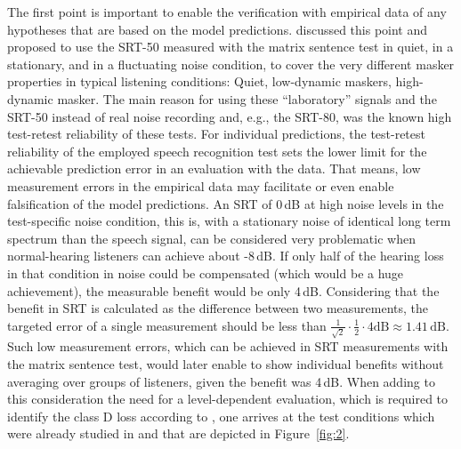 \documentclass[10pt,a4paper,twocolumn]{article}
\begin{document}
The first point is important to enable the verification with empirical data of any hypotheses that are based on the model predictions.
%
\cite{schaedler2020a} discussed this point and proposed to use the SRT-50 measured with the matrix sentence test in quiet, in a stationary, and in a fluctuating noise condition, to cover the very different masker properties in typical listening conditions: Quiet, low-dynamic maskers, high-dynamic masker.
%
The main reason for using these \enquote{laboratory} signals and the SRT-50 instead of real noise recording and, e.g., the SRT-80, was the known high test-retest reliability of these tests.
%
For individual predictions, the test-retest reliability of the employed speech recognition test sets the lower limit for the achievable prediction error in an evaluation with the data.
%
That means, low measurement errors in the empirical data may facilitate or even enable falsification of the model predictions.
%
An SRT of 0\,dB at high noise levels in the test-specific noise condition, this is, with a stationary noise of identical long term spectrum than the speech signal, can be considered very problematic when normal-hearing listeners can achieve about -8\,dB.
%
If only half of the hearing loss in that condition in noise could be compensated (which would be a huge achievement), the measurable benefit would be only 4\,dB.
%
Considering that the benefit in SRT is calculated as the difference between two measurements, the targeted error of a single measurement should be less than $\frac{1}{\sqrt{2}} \cdot \frac{1}{2} \cdot 4\text{dB} \approx 1.41\,\text{dB}$.
%
Such low measurement errors, which can be achieved in SRT measurements with the matrix sentence test, would later enable to show individual benefits without averaging over groups of listeners, given the benefit was 4\,dB.
%
When adding to this consideration the need for a level-dependent evaluation, which is required to identify the class D loss according to \cite{plomp1978}, one arrives at the test conditions which were already studied in \cite{kollmeier2015} and that are depicted in Figure~\ref{fig:2}.
\end{document}
